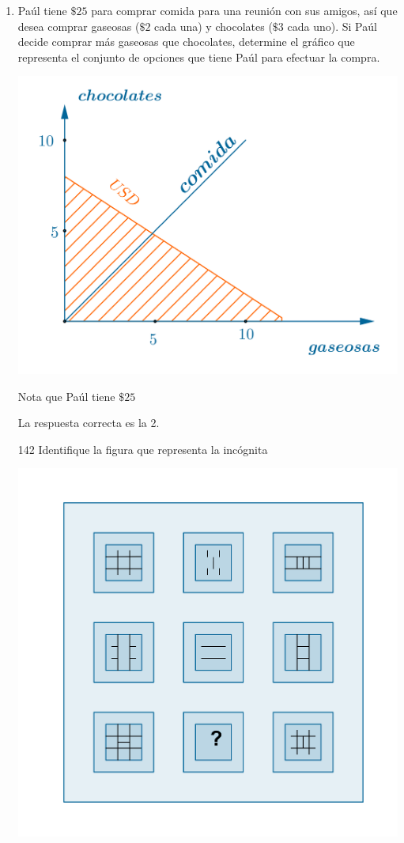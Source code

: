 \documentclass[11pt, a4paper]{article} %
\theoremstyle{dotlessP}
\theoremstyle{dotlessS}
\begin{document}
\begin{enumerate}[label=\color{dg}\theenumi.]
\item {\color{db}Paúl tiene \( \$25 \) para comprar comida para una reunión con sus amigos, así que desea comprar gaseosas (\( \$2 \) cada una) y chocolates (\( \$3 \) cada uno). Si Paúl decide comprar más gaseosas que chocolates, determine el gráfico que representa el conjunto de opciones que tiene Paúl para efectuar la compra. 
}
 \begin{center}
  		\includegraphics[scale=0.5]{SerBachiller25_fig1}
  \end{center}
  
  Nota que Paúl tiene \( \$25 \) 
  
  
  {\color{dh} La respuesta correcta es la 2.}
  \item[142] {\color{db}Identifique la figura que representa la incógnita
}
 \begin{center}
  		\includegraphics[scale=1]{SerBachiller142_fig1}
  \end{center}
 

\end{enumerate}
\end{document}
